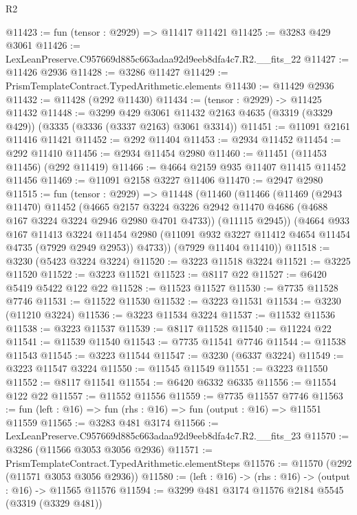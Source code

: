 \begin{lexlean}{R2}
\begin{coremodule}
@11423 := fun (tensor : @2929) => @11417 @11421
@11425 := @3283 @429 @3061
@11426 := LexLeanPreserve.C957669d885c663adaa92d9eeb8dfa4c7.R2.__fits_22
@11427 := @11426 @2936
@11428 := @3286 @11427
@11429 := PrismTemplateContract.TypedArithmetic.elements
@11430 := @11429 @2936
@11432 := @11428 (@292 @11430)
@11434 := (tensor : @2929) -> @11425 @11432
@11448 := @3299
    @429
    @3061
    @11432
    @2163
    @4635
    (@3319 (@3329 @429))
    (@3335 (@3336 (@3337 @2163) @3061 @3314))
@11451 := @11091 @2161 @11416 @11421
@11452 := @292 @11404
@11453 := @2934 @11452
@11454 := @292 @11410
@11456 := @2934 @11454 @2980
@11460 := @11451 (@11453 @11456) (@292 @11419)
@11466 := @4664 @2159 @935 @11407 @11415 @11452 @11456
@11469 := @11091 @2158 @3227 @11406
@11470 := @2947 @2980
@11515 := fun (tensor : @2929) =>
  @11448
    (@11460
      (@11466
        (@11469
          (@2943 @11470)
          @11452
          (@4665
            @2157
            @3224
            @3226
            @2942
            @11470
            @4686
            (@4688 @167 @3224 @3224 @2946 @2980 @4701 @4733))
          (@11115 @2945))
        (@4664
          @933
          @167
          @11413
          @3224
          @11454
          @2980
          (@11091 @932 @3227 @11412 @4654 @11454 @4735 (@7929 @2949 @2953))
          @4733))
      (@7929 @11404 @11410))
@11518 := @3230 (@5423 @3224 @3224)
@11520 := @3223 @11518 @3224
@11521 := @3225 @11520
@11522 := @3223 @11521
@11523 := @8117 @22
@11527 := @6420 @5419 @5422 @122 @22
@11528 := @11523 @11527
@11530 := @7735 @11528 @7746
@11531 := @11522 @11530
@11532 := @3223 @11531
@11534 := @3230 (@11210 @3224)
@11536 := @3223 @11534 @3224
@11537 := @11532 @11536
@11538 := @3223 @11537
@11539 := @8117 @11528
@11540 := @11224 @22
@11541 := @11539 @11540
@11543 := @7735 @11541 @7746
@11544 := @11538 @11543
@11545 := @3223 @11544
@11547 := @3230 (@6337 @3224)
@11549 := @3223 @11547 @3224
@11550 := @11545 @11549
@11551 := @3223 @11550
@11552 := @8117 @11541
@11554 := @6420 @6332 @6335
@11556 := @11554 @122 @22
@11557 := @11552 @11556
@11559 := @7735 @11557 @7746
@11563 := fun (left : @16) => fun (rhs : @16) => fun (output : @16) => @11551 @11559
@11565 := @3283 @481 @3174
@11566 := LexLeanPreserve.C957669d885c663adaa92d9eeb8dfa4c7.R2.__fits_23
@11570 := @3286 (@11566 @3053 @3056 @2936)
@11571 := PrismTemplateContract.TypedArithmetic.elementSteps
@11576 := @11570 (@292 (@11571 @3053 @3056 @2936))
@11580 := (left : @16) -> (rhs : @16) -> (output : @16) -> @11565 @11576
@11594 := @3299
    @481
    @3174
    @11576
    @2184
    @5545
    (@3319 (@3329 @481))

\end{coremodule}
\end{lexlean}

